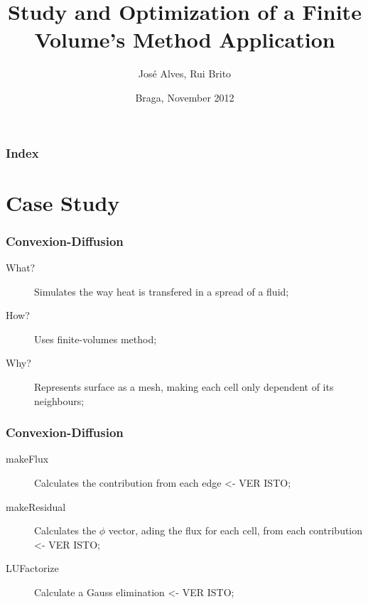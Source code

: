 \documentclass{beamer}
\title{Study and Optimization of a Finite Volume's Method Application}
\author{José Alves, Rui Brito}
\institute[pg22765, pg22781]{
	Universidade do Minho
}
\date{Braga, November 2012}
\begin{document}

\maketitle%

\begin{frame}
	\frametitle{Index}
	\tableofcontents
\end{frame}

\section{Case Study}

\begin{frame}[plain]
	\frametitle{Convexion-Diffusion}
	\begin{description}
		\item [What?]Simulates the way heat is transfered in a spread of a fluid;
		\item [How?] Uses finite-volumes method;
		\item [Why?] Represents surface as a mesh, making each cell only dependent of its neighbours;
	\end{description}
\end{frame}

\begin{frame}[plain]
	\frametitle{Convexion-Diffusion}
	\begin{description}
		\item [makeFlux] Calculates the contribution from each edge <- VER ISTO;
		\item [makeResidual] Calculates the $\phi$ vector, ading the flux for each cell, from each contribution <- VER ISTO;
		\item [LUFactorize] Calculate a Gauss elimination <- VER ISTO;
	\end{description}
\end{frame}
\end{document}

